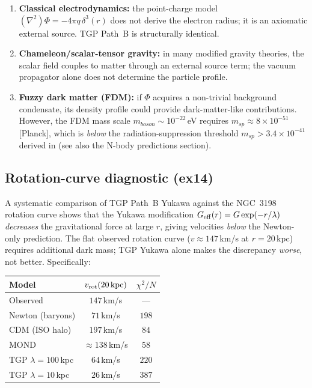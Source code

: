 \begin{enumerate}
\item \textbf{Classical electrodynamics:} the point-charge model
  $(\nabla^2)\Phi=-4\pi q\,\delta^3(r)$ does not derive the electron
  radius; it is an axiomatic external source.  TGP Path~B is
  structurally identical.

\item \textbf{Chameleon/scalar-tensor gravity:} in many modified
  gravity theories, the scalar field couples to matter through an
  external source term; the vacuum propagator alone does not determine
  the particle profile.

\item \textbf{Fuzzy dark matter (FDM):} if $\Phi$ acquires a
  non-trivial background condensate, its density profile could provide
  dark-matter-like contributions.  However, the FDM mass scale
  $m_{boson}\sim10^{-22}$\,eV requires
  $m_{sp}\approx8\times10^{-51}$\,[Planck], which is \emph{below}
  the radiation-suppression threshold $m_{sp}>3.4\times10^{-41}$
  derived in \cite{Efimov1970} (see also the N-body predictions section).
\end{enumerate}

\subsection{Rotation-curve diagnostic (ex14)}

A systematic comparison of TGP Path~B Yukawa against the NGC~3198
rotation curve shows that the Yukawa modification
$G_{\rm eff}(r)=G\exp(-r/\lambda)$ \emph{decreases} the gravitational
force at large $r$, giving velocities \emph{below} the Newton-only
prediction.  The flat observed rotation curve ($v\approx147$\,km/s
at $r=20$\,kpc) requires additional dark mass; TGP Yukawa alone makes
the discrepancy \emph{worse}, not better.  Specifically:

\begin{center}
\begin{tabular}{lcc}
\hline
Model & $v_{\rm rot}(20\,\mathrm{kpc})$ & $\chi^2/N$ \\
\hline
Observed & $147$\,km/s & --- \\
Newton (baryons) & $71$\,km/s & $198$ \\
CDM (ISO halo)   & $197$\,km/s & $84$ \\
MOND             & $\approx138$\,km/s & $58$ \\
TGP $\lambda=100$\,kpc & $64$\,km/s & $220$ \\
TGP $\lambda=10$\,kpc  & $26$\,km/s & $387$ \\
\hline
\end{tabular}
\end{center}

